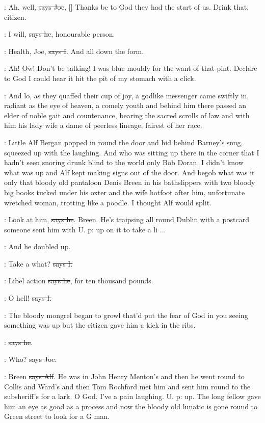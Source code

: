 \joe:
Ah, well, \sout{says Joe},
[]
Thanks be to God they had
the start of us. Drink that, citizen.

\citizen:
I will, \sout{says he}, honourable person.

:
Health, Joe, \sout{says I}. And all down the form.

\Nq:
Ah! Ow! Don't be talking! I was blue mouldy for the want of that
pint. Declare to God I could hear it hit the pit of my stomach with a
click.

:
And lo, as they quaffed their cup of joy, a godlike messenger came
swiftly in, radiant as the eye of heaven, a comely youth and behind him
there passed an elder of noble gait and countenance, bearing the sacred
scrolls of law and with him his lady wife a dame of peerless lineage,
fairest of her race.

\Nq:
Little Alf Bergan popped in round the door and hid behind Barney's
snug, squeezed up with the laughing. And who was sitting up there in the
corner that I hadn't seen snoring drunk blind to the world only Bob Doran.
I didn't know what was up and Alf kept making signs out of the door. And
begob what was it only that bloody old pantaloon Denis Breen in his
bathslippers with two bloody big books tucked under his oxter and the wife
hotfoot after him, unfortunate wretched woman, trotting like a poodle. I
thought Alf would split.

\bergan:
Look at him, \sout{says he}. Breen.
He's traipsing all round Dublin with a
postcard someone sent him with U. p: up on it to take a li ...

\Nq:
And he doubled up.

:
Take a what? \sout{says I.}

\bergan:
Libel action \sout{says he},
for ten thousand pounds.

:
O hell! \sout{says I.}

\Nq:
The bloody mongrel began to growl that'd put the fear of God in you
seeing something was up but the citizen gave him a kick in the ribs.

\citizen:
 \sout{says he}.

\joe:
Who? \sout{says Joe.}

\bergan:
Breen \sout{says Alf}.
He was in John Henry Menton's and then he went round
to Collis and Ward's and then Tom Rochford met him and sent him round
to the subsheriff's for a lark. O God, I've a pain laughing. U. p: up. The
long fellow gave him an eye as good as a process and now the bloody old
lunatic is gone round to Green street to look for a G man.

